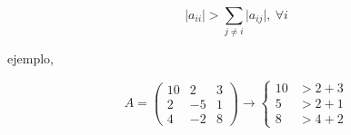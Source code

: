 \begin{equation*}
\lvert a_{ii} \rvert > \sum_{j\neq i} \lvert a_{ij} \rvert, \ \forall i
\end{equation*}
\begin{paracol}{2}
ejemplo,
\end{paracol}
\begin{equation*}
A=\begin{pmatrix}
10& 2 & 3\\
2& -5 & 1\\
4& -2 & 8
\end{pmatrix}\rightarrow \left\{ \begin{aligned}
10& > 2+3\\
5&> 2+1\\
8& > 4+2
\end{aligned} \right. 
\end{equation*}

